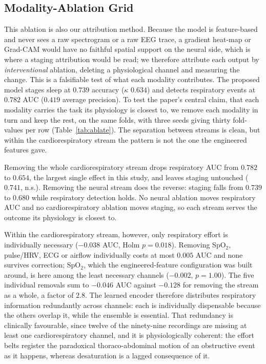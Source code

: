 \documentclass{ieeeaccess}
\newcommand{\mmAcc}{0.739}   %
\newcommand{\mmK}{0.634}     %
\newcommand{\mmAuc}{0.782}   %
\newcommand{\mmAp}{0.419}    %
\begin{document}
\subsection{Modality-Ablation Grid}
\label{sec:ablate}
This ablation is also our attribution method. Because the model is feature-based and never sees
a raw spectrogram or a raw EEG trace, a gradient heat-map or Grad-CAM would have no
faithful spatial support on the neural side, which is where a staging attribution would be
read; we
therefore attribute each output by \emph{interventional} ablation, deleting a physiological
channel and measuring the change. This is a falsifiable test of what each modality contributes.
The proposed model stages sleep at $\mmAcc$ accuracy ($\kappa$ $\mmK$) and detects respiratory
events at $\mmAuc$ AUC ($\mmAp$ average precision). To test the paper's central claim, that each
modality carries the task its physiology is closest to, we remove each modality in turn and keep the
rest, on the same folds, with three seeds giving thirty fold-values per row
(Table~\ref{tab:ablate}). The separation between streams is clean, but within the
cardiorespiratory stream the pattern is not the one the engineered features gave.

Removing the whole cardiorespiratory stream drops respiratory AUC from $\mmAuc$ to $0.654$,
the largest single effect in this study, and leaves staging untouched ($0.741$, n.s.).
Removing the neural stream does the reverse: staging falls from $\mmAcc$ to $0.680$ while
respiratory detection holds. No neural ablation moves respiratory AUC and no cardiorespiratory
ablation moves staging, so each stream serves the outcome its physiology is closest to.

Within the cardiorespiratory stream, however, only respiratory effort is individually necessary
($-0.038$ AUC, Holm $p=0.018$). Removing SpO$_2$, pulse/HRV, ECG or airflow individually costs
at most $0.005$ AUC and none survives correction; SpO$_2$, which the engineered-feature
configuration was built around, is here among the least necessary channels
($-0.002$, $p=1.00$). The five
individual removals sum to $-0.046$ AUC against $-0.128$ for removing the stream as a whole,
a factor of $2.8$. The learned encoder therefore distributes respiratory information redundantly
across channels: each is individually dispensable because the others overlap it, while the
ensemble is essential. That redundancy is clinically favourable, since
twelve of the ninety-nine recordings are missing at least one cardiorespiratory channel, and it is
physiologically coherent: the effort belts register the paradoxical thoraco-abdominal motion
of an obstructive event as it happens, whereas desaturation is a lagged consequence of it.
\end{document}

